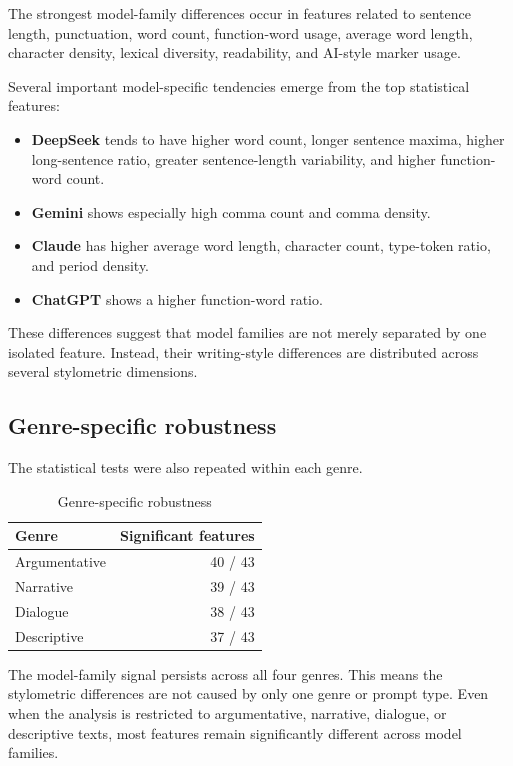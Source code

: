 The strongest model-family differences occur in features related to sentence length, punctuation, word count, function-word usage, average word length, character density, lexical diversity, readability, and AI-style marker usage.

Several important model-specific tendencies emerge from the top statistical features:
\begin{itemize}
  \item \textbf{DeepSeek} tends to have higher word count, longer sentence maxima, higher long-sentence ratio, greater sentence-length variability, and higher function-word count.
  \item \textbf{Gemini} shows especially high comma count and comma density.
  \item \textbf{Claude} has higher average word length, character count, type-token ratio, and period density.
  \item \textbf{ChatGPT} shows a higher function-word ratio.
\end{itemize}

These differences suggest that model families are not merely separated by one isolated feature. Instead, their writing-style differences are distributed across several stylometric dimensions.

\subsection{Genre-specific robustness}
The statistical tests were also repeated within each genre.

\begin{table}[ht]
\centering
\caption{Genre-specific robustness}
\label{tab:genre-robustness}
\begin{tabular}{lr}
\toprule
Genre & Significant features \\
\midrule
Argumentative & 40 / 43 \\
Narrative & 39 / 43 \\
Dialogue & 38 / 43 \\
Descriptive & 37 / 43 \\
\bottomrule
\end{tabular}
\end{table}

The model-family signal persists across all four genres. This means the stylometric differences are not caused by only one genre or prompt type. Even when the analysis is restricted to argumentative, narrative, dialogue, or descriptive texts, most features remain significantly different across model families.

